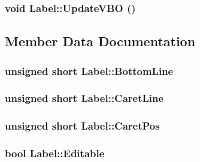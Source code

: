 \hypertarget{class_label_8cfc4630159f4953bbc721208f2c4e1d}{
\subsubsection[{UpdateVBO}]{\setlength{\rightskip}{0pt plus 5cm}void Label::UpdateVBO ()}}
\label{class_label_8cfc4630159f4953bbc721208f2c4e1d}




\subsection{Member Data Documentation}
\hypertarget{class_label_75bcf9a2e388edd745b36d7eb64af80d}{
\subsubsection[{BottomLine}]{\setlength{\rightskip}{0pt plus 5cm}unsigned short {\bf Label::BottomLine}}}
\label{class_label_75bcf9a2e388edd745b36d7eb64af80d}


\hypertarget{class_label_7163c9d05660995a186b0b307fb8666e}{
\subsubsection[{CaretLine}]{\setlength{\rightskip}{0pt plus 5cm}unsigned short {\bf Label::CaretLine}}}
\label{class_label_7163c9d05660995a186b0b307fb8666e}


\hypertarget{class_label_94b3f7d3f2fbd73994096c5e37933168}{
\subsubsection[{CaretPos}]{\setlength{\rightskip}{0pt plus 5cm}unsigned short {\bf Label::CaretPos}}}
\label{class_label_94b3f7d3f2fbd73994096c5e37933168}


\hypertarget{class_label_6c00ea894a9a737523c86c8b3a947026}{
\subsubsection[{Editable}]{\setlength{\rightskip}{0pt plus 5cm}bool {\bf Label::Editable}}}
\label{class_label_6c00ea894a9a737523c86c8b3a947026}


